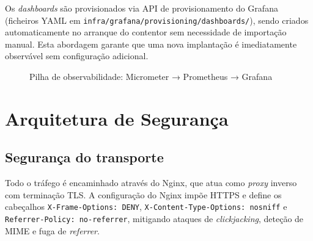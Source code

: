 Os \textit{dashboards} são provisionados via API de provisionamento do
Grafana (ficheiros YAML em
\texttt{infra/grafana/provisioning/dashboards/}), sendo criados
automaticamente no arranque do contentor sem necessidade de importação
manual.
Esta abordagem garante que uma nova implantação é imediatamente observável
sem configuração adicional.

\begin{figure}[htbp]
  \centering
  \caption{Pilha de observabilidade: Micrometer → Prometheus → Grafana}
  \label{fig:pilha_observabilidade}
\end{figure}

\section{Arquitetura de Segurança}
\label{sec:seguranca_deepdive}

\subsection*{Segurança do transporte}

Todo o tráfego é encaminhado através do Nginx, que atua como
\textit{proxy} inverso com terminação TLS.
A configuração do Nginx impõe HTTPS e define os cabeçalhos
\texttt{X-Frame-Options: DENY}, \texttt{X-Content-Type-Options: nosniff}
e \texttt{Referrer-Policy: no-referrer}, mitigando ataques de
\textit{clickjacking}, deteção de MIME e fuga de \textit{referrer}.

